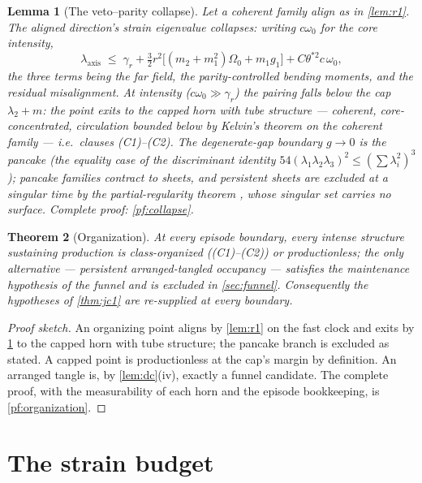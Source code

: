 \documentclass[11pt,letterpaper]{amsart}
\newtheorem{theorem}{Theorem}[section]
\newtheorem{lemma}[theorem]{Lemma}
\theoremstyle{definition}
\theoremstyle{remark}
\newcommand{\om}{\omega}
\begin{document}
\begin{lemma}[The veto--parity collapse]\label{lem:collapse}
Let a coherent family align as in \cref{lem:r1}. The aligned direction's strain
eigenvalue collapses: writing $c\om_0$ for the core intensity,
\[
\lambda_{\mathrm{axis}}\;\le\;\gamma_r+\tfrac32r^2\bigl[(m_2+m_1^2)\Omega_0+m_1g_1\bigr]
+C\theta^{*2}c\,\om_0,
\]
the three terms being the far field, the parity-controlled bending moments, and the
residual misalignment. At intensity ($c\om_0\gg\gamma_r$) the pairing falls below the
cap $\lambda_2+m$: the point exits to the capped horn \emph{with tube structure} ---
coherent, core-concentrated, circulation bounded below by Kelvin's theorem on the
coherent family --- i.e.\ clauses \textup{(C1)--(C2)}. The degenerate-gap boundary
$g\to0$ is the pancake (the equality case of the discriminant identity
$54(\lambda_1\lambda_2\lambda_3)^2\le(\sum\lambda_i^2)^3$); pancake families contract
to sheets, and persistent sheets are excluded at a singular time by the
partial-regularity theorem \cite{CKN1982,Lin1998}, whose singular set carries no
surface. Complete proof: \cref{pf:collapse}.
\end{lemma}

\begin{theorem}[Organization]\label{thm:organization}
At every episode boundary, every intense structure sustaining production is
class-organized \textup{((C1)--(C2))} or productionless; the only alternative ---
persistent arranged-tangled occupancy --- satisfies the maintenance hypothesis of the
funnel and is excluded in \cref{sec:funnel}. Consequently the hypotheses of
\cref{thm:jc1} are re-supplied at every boundary.
\end{theorem}

\begin{proof}[Proof sketch]
An organizing point aligns by \cref{lem:r1} on the fast clock and exits by
\cref{lem:collapse} to the capped horn with tube structure; the pancake branch is
excluded as stated. A capped point is productionless at the cap's margin by
definition. An arranged tangle is, by \cref{lem:dc}(iv), exactly a funnel candidate.
The complete proof, with the measurability of each horn and the episode bookkeeping,
is \cref{pf:organization}.
\end{proof}

\section{The strain budget}\label{sec:budget}
\end{document}
